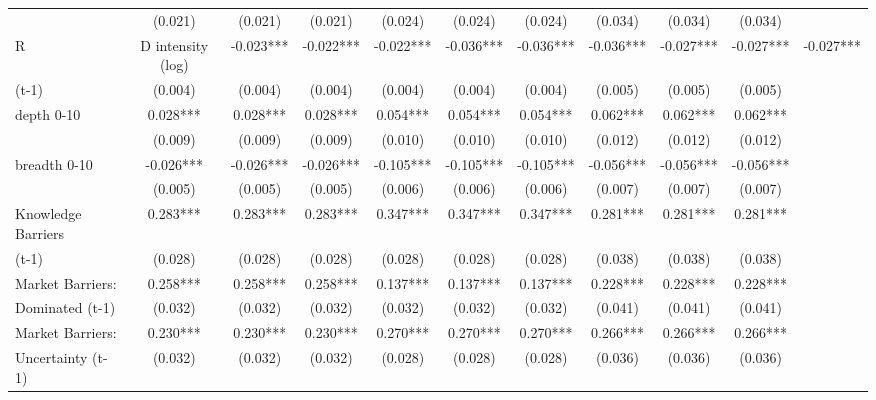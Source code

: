 \begin{table}[htbp]
\begin{tabular}{l*{9}{c}}
                    &     (0.021)   &     (0.021)   &     (0.021)   &     (0.024)   &     (0.024)   &     (0.024)   &     (0.034)   &     (0.034)   &     (0.034)   \\
R&D intensity (log) &      -0.023***&      -0.022***&      -0.022***&      -0.036***&      -0.036***&      -0.036***&      -0.027***&      -0.027***&      -0.027***\\
(t-1)               &     (0.004)   &     (0.004)   &     (0.004)   &     (0.004)   &     (0.004)   &     (0.004)   &     (0.005)   &     (0.005)   &     (0.005)   \\
depth 0-10          &       0.028***&       0.028***&       0.028***&       0.054***&       0.054***&       0.054***&       0.062***&       0.062***&       0.062***\\
                    &     (0.009)   &     (0.009)   &     (0.009)   &     (0.010)   &     (0.010)   &     (0.010)   &     (0.012)   &     (0.012)   &     (0.012)   \\
breadth 0-10        &      -0.026***&      -0.026***&      -0.026***&      -0.105***&      -0.105***&      -0.105***&      -0.056***&      -0.056***&      -0.056***\\
                    &     (0.005)   &     (0.005)   &     (0.005)   &     (0.006)   &     (0.006)   &     (0.006)   &     (0.007)   &     (0.007)   &     (0.007)   \\
Knowledge Barriers  &       0.283***&       0.283***&       0.283***&       0.347***&       0.347***&       0.347***&       0.281***&       0.281***&       0.281***\\
(t-1)               &     (0.028)   &     (0.028)   &     (0.028)   &     (0.028)   &     (0.028)   &     (0.028)   &     (0.038)   &     (0.038)   &     (0.038)   \\
Market Barriers:    &       0.258***&       0.258***&       0.258***&       0.137***&       0.137***&       0.137***&       0.228***&       0.228***&       0.228***\\
Dominated (t-1)     &     (0.032)   &     (0.032)   &     (0.032)   &     (0.032)   &     (0.032)   &     (0.032)   &     (0.041)   &     (0.041)   &     (0.041)   \\
Market Barriers:    &       0.230***&       0.230***&       0.230***&       0.270***&       0.270***&       0.270***&       0.266***&       0.266***&       0.266***\\
Uncertainty (t-1)   &     (0.032)   &     (0.032)   &     (0.032)   &     (0.028)   &     (0.028)   &     (0.028)   &     (0.036)   &     (0.036)   &     (0.036)   \\

\end{tabular}
\end{table}
